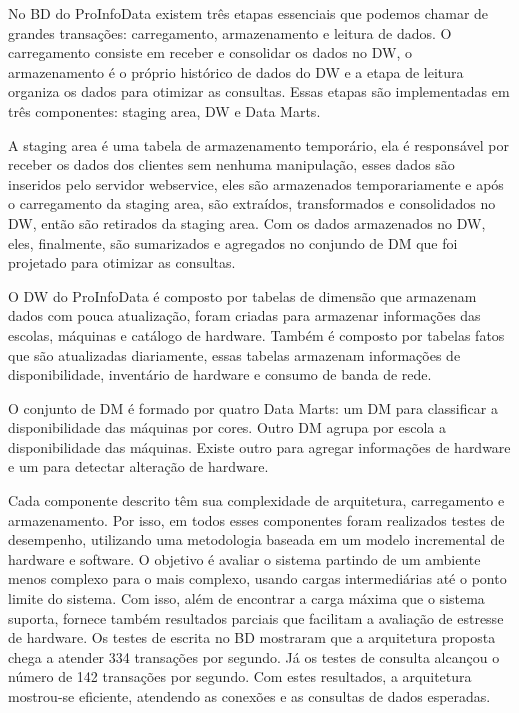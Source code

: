 No BD do ProInfoData existem três etapas essenciais que podemos chamar de
grandes transações: carregamento, armazenamento e leitura de dados. O
carregamento consiste em receber e consolidar os dados no DW, o armazenamento é
o próprio histórico de dados do DW e a etapa de leitura organiza os dados para
otimizar as consultas. Essas etapas são implementadas em três componentes:
staging area, DW e Data Marts.

A staging area é uma tabela de armazenamento temporário, ela é responsável por
receber os dados dos clientes sem nenhuma manipulação, esses dados são inseridos
pelo servidor webservice, eles são armazenados temporariamente e após o
carregamento da staging area, são extraídos, transformados e consolidados no DW,
então são retirados da staging area. Com os dados armazenados no DW, eles,
finalmente, são sumarizados e agregados no conjundo de DM que foi projetado para
otimizar as consultas.

O DW do ProInfoData é composto por tabelas de dimensão que armazenam dados com
pouca atualização, foram criadas para armazenar informações das escolas, máquinas
e catálogo de hardware. Também é composto por tabelas fatos que são atualizadas
diariamente, essas tabelas armazenam informações de disponibilidade, inventário
de hardware e consumo de banda de rede.

O conjunto de DM é formado por quatro Data Marts: um DM para classificar a
disponibilidade das máquinas por cores. Outro DM agrupa por escola a
disponibilidade das máquinas. Existe outro para agregar informações de hardware
e um para detectar alteração de hardware.


Cada componente descrito têm sua complexidade de arquitetura, carregamento e
armazenamento. Por isso, em todos esses componentes foram realizados testes de
desempenho, utilizando uma metodologia baseada em um modelo incremental de
hardware e software. O objetivo é avaliar o sistema partindo de um ambiente
menos complexo para o mais complexo, usando cargas intermediárias até o ponto
limite do sistema. Com isso, além de encontrar a carga máxima que o sistema
suporta, fornece também resultados parciais que facilitam a avaliação de
estresse de hardware. Os testes de escrita no BD mostraram que a arquitetura
proposta chega a atender 334 transações por segundo. Já os testes de consulta
alcançou o número de 142 transações por segundo. Com estes resultados, a
arquitetura mostrou-se eficiente, atendendo as conexões e as consultas de dados
esperadas.

